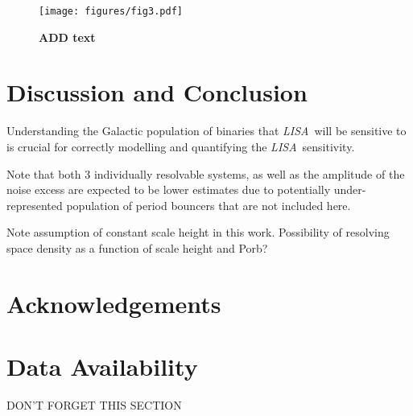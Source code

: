 \documentclass[fleqn,usenatbib]{mnras}
\newcommand{\lisa}{{\it LISA}}
\begin{document}
\begin{figure}
	\texttt{[image: figures/fig3.pdf]}
    \caption{ \textbf{ADD text } }
    \label{fig:isd}
\end{figure}






\section{Discussion and Conclusion} \label{sec:discussion}






Understanding the Galactic population of binaries that \lisa\ will be sensitive to is crucial for correctly modelling and quantifying the \lisa\ sensitivity.



Note that both 3 individually resolvable systems, as well as the amplitude of the noise excess are expected to be lower estimates due to potentially under-represented population of period bouncers that are not included here.


Note assumption of constant scale height in this work. Possibility of resolving space density as a function of scale height and Porb?



\section*{Acknowledgements}



\section*{Data Availability}

DON'T FORGET THIS SECTION







\end{document}
